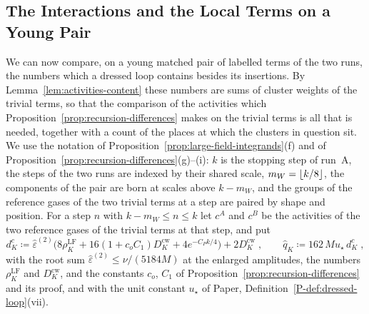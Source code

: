 \documentclass[11pt]{preprint}
\DeclarePairedDelimiter{\floor}{\lfloor}{\rfloor}
\numberwithin{equation}{section}
\theoremstyle{definition}
\theoremstyle{remark}
\theoremstyle{plain}
\begin{document}
\subsection{The Interactions and the Local Terms on a Young Pair}\label{sec:young-pair-weights}

We can now compare, on a young matched pair of labelled terms of the two runs, the numbers which a dressed loop contains besides its insertions. By Lemma~\ref{lem:activities-content} these numbers are sums of cluster weights of the trivial terms, so that the comparison of the activities which Proposition~\ref{prop:recursion-differences} makes on the trivial terms is all that is needed, together with a count of the places at which the clusters in question sit. We use the notation of Proposition~\ref{prop:large-field-integrands}(f) and of Proposition~\ref{prop:recursion-differences}(g)--(i): $k$ is the stopping step of run~A, the steps of the two runs are indexed by their shared scale, $m_W = \floor{k/8}$, the components of the pair are born at scales above $k - m_W$, and the groups of the reference gases of the two trivial terms at a step are paired by shape and position. For a step $n$ with $k - m_W \leq n \leq k$ let $c^A$ and $c^B$ be the activities of the two reference gases of the trivial terms at that step, and put
\begin{equation}\label{eq:young-activity-difference}
    d^c_K \coloneqq \hat\varepsilon^{(2)}\bigl(8\rho^{\mathrm{LF}}_K + 16(1 + c_oC_1)D^{\mathrm{cw}}_K + 4e^{-C_Pk/4}\bigr) + 2D^{\mathrm{cw}}_K\;,
    \qquad
    \hat q_K \coloneqq 162\,Mu_\star\,d^c_K\;,
\end{equation}
with the root sum $\hat\varepsilon^{(2)} \leq \nu/(5184M)$ at the enlarged amplitudes, the numbers $\rho^{\mathrm{LF}}_K$ and $D^{\mathrm{cw}}_K$, and the constants $c_o$, $C_1$ of Proposition~\ref{prop:recursion-differences} and its proof, and with the unit constant $u_\star$ of Paper, Definition~\ref{P-def:dressed-loop}(vii).
\end{document}
